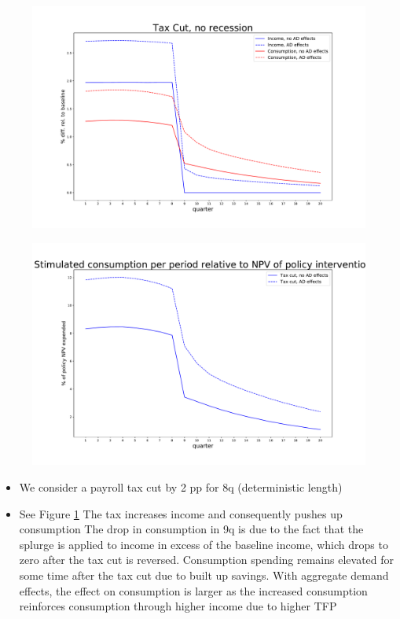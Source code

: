 \documentclass[]{article}
\begin{document}
\begin{figure}
	\centering
	\includegraphics[width=\linewidth]{../full_run/tax_cut}
	\caption{}
	\label{fig:taxcut}
\end{figure}
\begin{figure}
	\centering
	\includegraphics[width=\linewidth]{../full_run/stimulated-consumption_TaxCut}
	\caption{}
	\label{fig:stimulated-consumptiontaxcut}
\end{figure}


\begin{itemize}
	\item We consider a payroll tax cut by 2 pp for 8q (deterministic length)
	\item See Figure \ref{fig:taxcut}
	\subitem The tax increases income and consequently pushes up consumption
	\subitem The drop in consumption in 9q is due to the fact that the splurge is applied to income in excess of the baseline income, which drops to zero after the tax cut is reversed. Consumption spending remains elevated for some time after the tax cut due to built up savings. 
	\subitem With aggregate demand effects, the effect on consumption is larger as the increased consumption reinforces consumption through higher income due to higher TFP	
\end{itemize}
\end{document}
